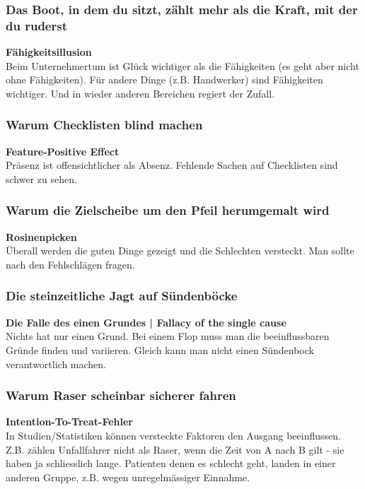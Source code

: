 \documentclass[a4paper, twocolumn]{article}
\begin{document}
\subsubsection*{Das Boot, in dem du sitzt, zählt mehr als die Kraft, mit der du ruderst}
\textbf{Fähigkeitsillusion}\\
Beim Unternehmertum ist Glück wichtiger als die Fähigkeiten (es geht aber nicht ohne Fähigkeiten). Für andere Dinge (z.B. Handwerker) sind Fähigkeiten wichtiger. Und in wieder anderen Bereichen regiert der Zufall.

\subsubsection*{Warum Checklisten blind machen}
\textbf{Feature-Positive Effect}\\
Präsenz ist offensichtlicher als Absenz. Fehlende Sachen auf Checklisten sind schwer zu sehen.

\subsubsection*{Warum die Zielscheibe um den Pfeil herumgemalt wird}
\textbf{Rosinenpicken}\\
Überall werden die guten Dinge gezeigt und die Schlechten versteckt. Man sollte nach den Fehlschlägen fragen.

\subsubsection*{Die steinzeitliche Jagt auf Sündenböcke}
\textbf{Die Falle des einen Grundes | Fallacy of the single cause}\\
Nichts hat nur einen Grund. Bei einem Flop muss man die beeinflussbaren Gründe finden und variieren. Gleich kann man nicht einen Sündenbock verantwortlich machen.

\subsubsection*{Warum Raser scheinbar sicherer fahren}
\textbf{Intention-To-Treat-Fehler}\\
In Studien/Statistiken können versteckte Faktoren den Ausgang beeinflussen. Z.B. zählen Unfallfahrer nicht als Raser, wenn die Zeit von A nach B gilt - sie haben ja schliesslich lange. Patienten denen es schlecht geht, landen in einer anderen Gruppe, z.B. wegen unregelmässiger Einnahme.
\end{document}
